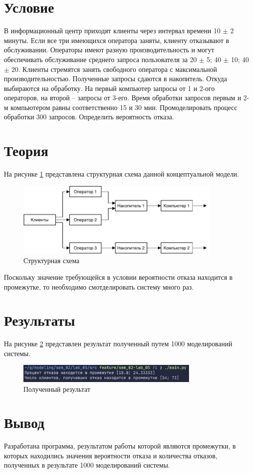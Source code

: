 \section{Условие}

В информационный центр приходят клиенты через интервал времени 10 $\pm$ 2 минуты. Если все три имеющихся оператора заняты, клиенту отказывают в обслуживании. Операторы имеют разную производительность и могут обеспечивать обслуживание среднего запроса пользователя за 20 $\pm$ 5; 40 $\pm$ 10; 40 $\pm$ 20. Клиенты стремятся занять свободного оператора с максимальной производительностью. Полученные запросы сдаются в накопитель. Откуда выбираются на обработку. На первый компьютер запросы от 1 и 2-ого операторов, на второй -- запросы от 3-его. Время обработки запросов первым и 2-м компьютером равны соответственно 15 и 30 мин. Промоделировать процесс обработки 300 запросов. Определить вероятность отказа.

\section{Теория}

На рисунке \ref{fig:model} представлена структурная схема  данной концептуальной модели.

\begin{figure}[H]
    \centering
    \includegraphics[width=0.9\textwidth]{img/content/model.pdf}
    \caption{Структурная схема}
    \label{fig:model}
\end{figure}

Поскольку значение требующейся в условии вероятности отказа находится в промежутке, то необходимо смотделировать систему много раз.

\section{Результаты}

На рисунке \ref{fig:result} представлен результат полученный путем 1000 моделирований системы.

\begin{figure}[H]
    \centering
    \includegraphics[width=0.8\textwidth]{img/content/result.png}
    \caption{Полученный результат}
    \label{fig:result}
\end{figure}

\section{Вывод}

Разработана программа, результатом работы которой являются промежутки, в которых находились значения вероятности отказа и количества отказов, полученных в результате 1000 моделирований системы.
